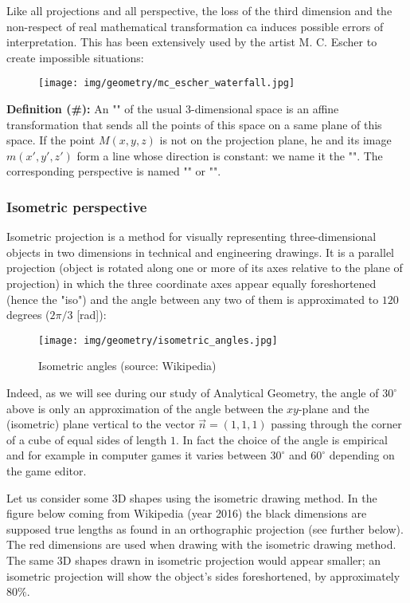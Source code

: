 	Like all projections and all perspective, the loss of the third dimension and the non-respect of real mathematical transformation ca induces possible errors of interpretation. This has been extensively used by the artist M. C. Escher to create impossible situations:
	\begin{figure}[H]
		\centering
		\texttt{[image: img/geometry/mc\_escher\_waterfall.jpg]}
	\end{figure}
	\textbf{Definition (\#\mydef):} An "" of the usual 3-dimensional space is an affine transformation that sends all the points of this space on a same plane of this space. If the point $M (x, y, z)$ is not on the projection plane, he and its image $m (x ', y', z ')$ form a line whose direction is constant: we name it the "". The corresponding perspective is named "" or "".
	
	
	\pagebreak
	\subsubsection{Isometric perspective}
	Isometric projection is a method for visually representing three-dimensional objects in two dimensions in technical and engineering drawings. It is a parallel projection (object is rotated along one or more of its axes relative to the plane of projection) in which the three coordinate axes appear equally foreshortened (hence the "iso") and the angle between any two of them is approximated to $120$ degrees ($2\pi/3$ [rad]):
	\begin{figure}[H]
		\centering
		\texttt{[image: img/geometry/isometric\_angles.jpg]}
		\caption{Isometric angles (source: Wikipedia)}
	\end{figure}
	Indeed, as we will see during our study of Analytical Geometry, the angle of $30^\circ$ above is only an approximation of the angle between the $xy$-plane and the (isometric) plane vertical to the vector $\vec{n}=(1,1,1)$ passing through the corner of a cube of equal sides of length $1$. In fact the choice of the angle is empirical and for example in computer games it varies between $30^\circ$ and $60^\circ$ depending on the game editor.
		
	Let us consider some 3D shapes using the isometric drawing method. In the figure below coming from Wikipedia (year 2016) the black dimensions are supposed true lengths as found in an orthographic projection (see further below). The red dimensions are used when drawing with the isometric drawing method. The same 3D shapes drawn in isometric projection would appear smaller; an isometric projection will show the object's sides foreshortened, by approximately $80\%$.
	

